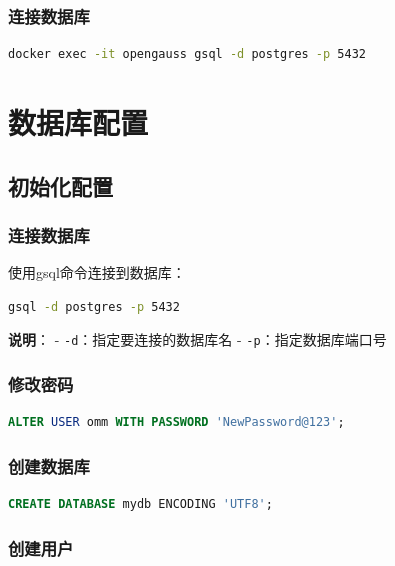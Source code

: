 \documentclass[12pt,UTF8]{ctexbook}
\begin{document}
\subsection{连接数据库}

\begin{lstlisting}[language=bash, caption=连接Docker中的数据库]
docker exec -it opengauss gsql -d postgres -p 5432
\end{lstlisting}

\chapter{数据库配置}

\section{初始化配置}

\subsection{连接数据库}

使用gsql命令连接到数据库：

\begin{lstlisting}[language=bash, caption=连接数据库]
gsql -d postgres -p 5432
\end{lstlisting}

\textbf{说明}：
- \texttt{-d}：指定要连接的数据库名
- \texttt{-p}：指定数据库端口号

\subsection{修改密码}

\begin{lstlisting}[language=sql, caption=修改管理员密码]
ALTER USER omm WITH PASSWORD 'NewPassword@123';
\end{lstlisting}

\subsection{创建数据库}

\begin{lstlisting}[language=sql, caption=创建新数据库]
CREATE DATABASE mydb ENCODING 'UTF8';
\end{lstlisting}

\subsection{创建用户}
\end{document}
